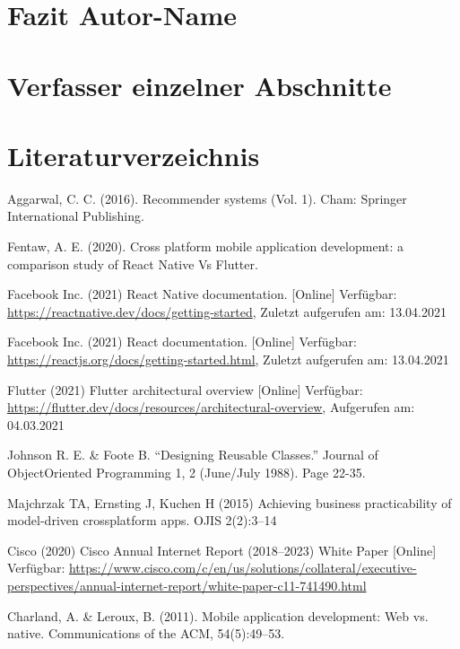 \documentclass[11pt,a4paper]{article}
\begin{document}
\section[Fazit]{Fazit \hfill \normalfont \small{Autor-Name}}
\newpage

\appendix
\section{Verfasser einzelner Abschnitte}

\newpage

\section*{Literaturverzeichnis}
\begin{itemize}
	 Aggarwal, C. C. (2016). Recommender systems (Vol. 1). Cham: Springer International Publishing.

	 Fentaw, A. E. (2020). Cross platform mobile application development: a comparison study of React Native Vs Flutter.

	 Facebook Inc. (2021) React Native documentation. [Online] Verfügbar: \url{https://reactnative.dev/docs/getting-started}, Zuletzt aufgerufen am: 13.04.2021

	 Facebook Inc. (2021) React documentation. [Online] Verfügbar: \url{https://reactjs.org/docs/getting-started.html}, Zuletzt aufgerufen am: 13.04.2021

	 Flutter (2021) Flutter architectural overview [Online] Verfügbar: \url{https://flutter.dev/docs/resources/architectural-overview}, Aufgerufen am: 04.03.2021

	 Johnson R. E. \&  Foote B. “Designing Reusable Classes.” Journal of ObjectOriented Programming 1, 2 (June/July 1988). Page 22-35.

	 Majchrzak TA, Ernsting J, Kuchen H (2015) Achieving business practicability of model-driven crossplatform apps. OJIS 2(2):3–14

	 Cisco (2020) Cisco Annual Internet Report (2018–2023) White Paper [Online] Verfügbar: \url{https://www.cisco.com/c/en/us/solutions/collateral/executive-perspectives/annual-internet-report/white-paper-c11-741490.html}

	 Charland, A. \& Leroux, B. (2011). Mobile application development: Web vs. native. Communications of the ACM, 54(5):49–53.


\end{itemize}
\end{document}

